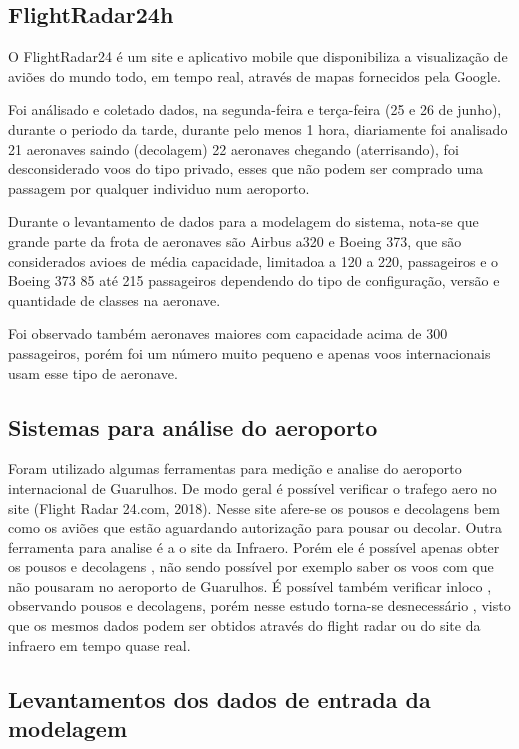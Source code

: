 \documentclass[12pt]{article}
\begin{document}
\subsection{FlightRadar24h}


O  FlightRadar24 é um site e aplicativo mobile que disponibiliza a
visualização de aviões do mundo todo, em tempo real, através de mapas 
fornecidos pela Google.

Foi análisado e coletado dados, na segunda-feira e terça-feira (25 e 26 de junho), durante 
o periodo da tarde, durante pelo menos 1 hora, diariamente foi analisado 21
aeronaves saindo (decolagem) 22 aeronaves chegando (aterrisando), foi desconsiderado voos do 
tipo privado, esses que não podem ser comprado uma passagem por qualquer
individuo num aeroporto.

Durante o levantamento de dados para a modelagem do sistema, nota-se que grande parte
da frota de aeronaves são Airbus a320 e Boeing 373, que são considerados avioes de média
capacidade, limitadoa a 120 a 220, passageiros e o Boeing 373 85 até 215 passageiros 
dependendo do tipo de configuração, versão e quantidade de classes na aeronave.

Foi observado também aeronaves maiores com capacidade acima de 300 passageiros, porém 
foi um número muito pequeno e apenas voos internacionais usam esse tipo de aeronave.

\subsection{Sistemas para análise do aeroporto}

Foram utilizado algumas ferramentas para medição e analise do aeroporto 
internacional de Guarulhos. De modo geral é possível verificar o trafego
aero no site (Flight Radar 24.com, 2018). Nesse site afere-se os pousos 
e decolagens bem como os aviões que estão aguardando autorização para pousar
ou decolar. Outra ferramenta para analise é a o site da Infraero. Porém 
ele é possível apenas obter os pousos e decolagens , não sendo possível
por exemplo saber os voos com que não pousaram no aeroporto de Guarulhos.
É possível também verificar inloco , observando pousos e decolagens, porém
nesse estudo torna-se desnecessário , visto que os mesmos dados podem ser
obtidos através do flight radar ou do site da infraero em tempo quase
real.

\subsection{Levantamentos dos dados de entrada da modelagem}
\end{document}
